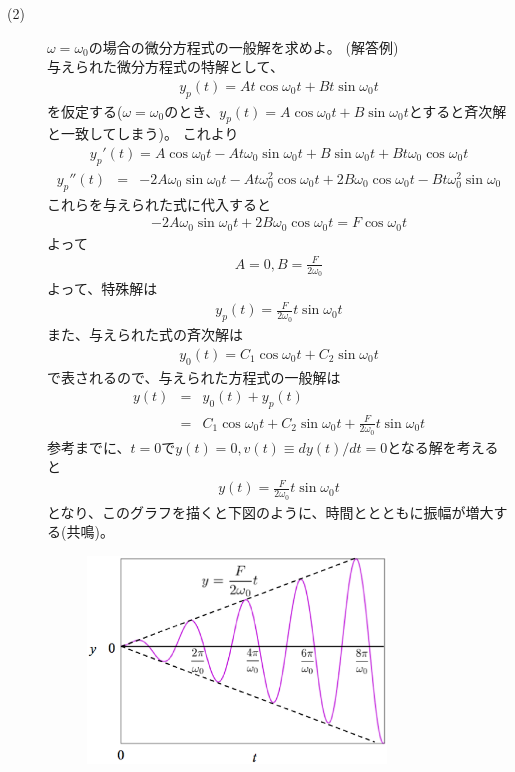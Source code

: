 \documentclass[a4paper,11pt,fleqn]{jarticle}
\begin{document}
\begin{description}
\item[(2)]$\omega=\omega_0$の場合の微分方程式の一般解を求めよ。
(解答例)\\
与えられた微分方程式の特解として、
\begin{eqnarray*}
y_p(t)=At \cos \omega_{0}t + Bt \sin \omega_{0}t
\end{eqnarray*}
を仮定する($\omega=\omega_{0}$のとき、$y_p(t)=A \cos \omega_{0}t + B\sin \omega_{0}t$とすると斉次解と一致してしまう)。
これより
\begin{eqnarray*}
y_p'(t)=A \cos \omega_{0}t - At\omega_{0} \sin \omega_{0}t+ B \sin \omega_{0}t+ Bt\omega_{0} \cos \omega_{0}t
\end{eqnarray*}
\begin{eqnarray*}
y_p''(t)&=&-2A \omega_{0}\sin \omega_{0}t - At\omega_{0}^{2} \cos \omega_{0}t + 2B \omega_{0} \cos \omega_{0}t -Bt\omega_{0}^{2} \sin \omega_{0}
\end{eqnarray*}
これらを与えられた式に代入すると
\begin{eqnarray*}
-2A\omega_{0} \sin \omega_{0}t +2B\omega_{0}\cos \omega_{0}t = F\cos \omega_{0}t
\end{eqnarray*}
よって
\begin{eqnarray*}
A=0, B= \frac{F}{2\omega_{0}}
\end{eqnarray*}
よって、特殊解は
\begin{eqnarray*}
y_{p}(t)=\frac{F}{2\omega_{0}}t\sin \omega_{0}t
\end{eqnarray*}
また、与えられた式の斉次解は
\begin{eqnarray*}
y_{0}(t)=C_{1} \cos \omega_{0}t + C_{2}\sin \omega_{0}t
\end{eqnarray*}
で表されるので、与えられた方程式の一般解は
\begin{eqnarray*}
y(t)&=&y_0(t)+y_p(t)\\
     &=&C_{1} \cos \omega_{0}t + C_{2}\sin \omega_{0}t +\frac{F}{2\omega_{0}}t\sin \omega_{0}t
\end{eqnarray*}
参考までに、$t=0$で$y(t)=0,v(t)\equiv dy(t)/dt =0$となる解を考えると
\begin{eqnarray*}
y(t)=\frac{F}{2\omega_{0}}t\sin \omega_{0}t
\end{eqnarray*}
となり、このグラフを描くと下図のように、時間ととともに振幅が増大する(共鳴)。\\
\begin{figure}[htbp]
\begin{center}
\includegraphics[height=5.5cm,keepaspectratio]{kyoumei.eps}
\label{fig:kyoumei}
\end{center}
\end{figure}
\end{description}
\end{document}
